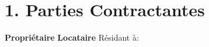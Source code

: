 \section*{1. Parties Contractantes}
\textbf{Propriétaire}
\ContractLandlordsFR
\vspace{0.5cm}
\textbf{Locataire}
\ContractTenantsFR
Résidant à: \Propaddress
